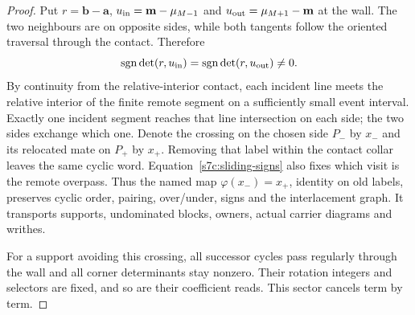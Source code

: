 \begin{proof}
Put $r=\mathbf b-\mathbf a$, $u_{\rm in}=\mathbf m-\mu_{M-1}$ and
$u_{\rm out}=\mu_{M+1}-\mathbf m$ at the wall.  The two neighbours are on opposite
sides, while both tangents follow the oriented traversal through the
contact.  Therefore
\begin{equation}\label{s7c:sliding-signs}
 \operatorname{sgn}\det(r,u_{\rm in})=\operatorname{sgn}\det(r,u_{\rm out})\ne0.
\end{equation}
By continuity from the relative-interior contact, each incident line
meets the relative interior of the finite remote segment on a sufficiently
small event interval.  Exactly one incident segment reaches that line
intersection on each side; the two sides exchange which one.  Denote
the crossing on the chosen side $P_-$ by $x_-$ and its relocated mate
on $P_+$ by $x_+$.  Removing that label within the contact collar
leaves the same cyclic word.  Equation~\eqref{s7c:sliding-signs} also
fixes which visit is the remote overpass.  Thus the named map
$\varphi(x_-)=x_+$, identity on old labels, preserves cyclic order,
pairing, over/under, signs and the interlacement graph.  It transports
supports, undominated blocks, owners, actual carrier diagrams and writhes.

For a support avoiding this crossing, all successor cycles pass regularly
through the wall and all corner determinants stay nonzero.  Their
rotation integers and selectors are fixed, and so are their coefficient
reads.  This sector cancels term by term.


\end{proof}
